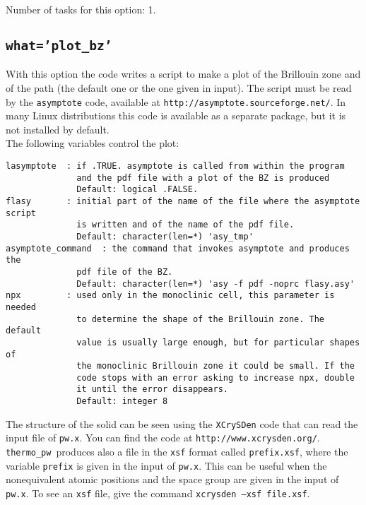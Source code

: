 \documentclass[12pt,a4paper]{article}
\def\thermo{\texttt{thermo\_pw}}
\begin{document}
Number of tasks for this option: 1.

\subsection{\color{web-blue}\texttt{what='plot\_bz'}}
With this option the code writes a script to make a plot
of the Brillouin zone and of the path (the default one or the one given in 
input). 
The script must be read by the \texttt{asymptote} code, available at 
\texttt{http://asymptote.sourceforge.net/}. In many Linux distributions
this code is available as a separate package, but it is not installed by
default. \\
The following variables control the plot:
\begin{verbatim}
lasymptote  : if .TRUE. asymptote is called from within the program
              and the pdf file with a plot of the BZ is produced
              Default: logical .FALSE.
flasy       : initial part of the name of the file where the asymptote script
              is written and of the name of the pdf file.
              Default: character(len=*) 'asy_tmp'
asymptote_command  : the command that invokes asymptote and produces the 
              pdf file of the BZ.
              Default: character(len=*) 'asy -f pdf -noprc flasy.asy'
npx         : used only in the monoclinic cell, this parameter is needed
              to determine the shape of the Brillouin zone. The default
              value is usually large enough, but for particular shapes of
              the monoclinic Brillouin zone it could be small. If the
              code stops with an error asking to increase npx, double 
              it until the error disappears.
              Default: integer 8
\end{verbatim}
The structure of the solid can be seen using the \texttt{XCrySDen} code
that can read the input file of \texttt{pw.x}. You can find the code at
\texttt{http://www.xcrysden.org/}. \thermo\ produces also a file in the
\texttt{xsf} format called \texttt{prefix.xsf}, where the variable 
\texttt{prefix}
is given in the input of \texttt{pw.x}. This can be useful when
the nonequivalent atomic positions and the space group are given in the input
of \texttt{pw.x}. To see an \texttt{xsf} file, give the command
\texttt{xcrysden --xsf file.xsf}.
\end{document}
